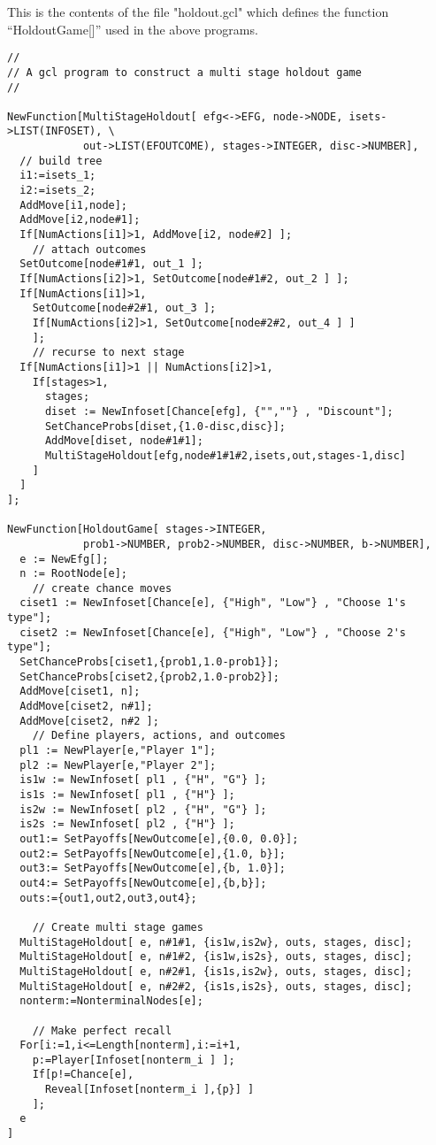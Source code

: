 \newpage
\noindent
This is the contents of the file "holdout.gcl" which defines the
function ``HoldoutGame[]'' used in the above programs.

{\scriptsize 
\begin{verbatim}
//
// A gcl program to construct a multi stage holdout game
//

NewFunction[MultiStageHoldout[ efg<->EFG, node->NODE, isets->LIST(INFOSET), \
            out->LIST(EFOUTCOME), stages->INTEGER, disc->NUMBER],
  // build tree
  i1:=isets_1;
  i2:=isets_2;
  AddMove[i1,node];
  AddMove[i2,node#1];
  If[NumActions[i1]>1, AddMove[i2, node#2] ];
    // attach outcomes
  SetOutcome[node#1#1, out_1 ]; 
  If[NumActions[i2]>1, SetOutcome[node#1#2, out_2 ] ];
  If[NumActions[i1]>1, 
    SetOutcome[node#2#1, out_3 ];
    If[NumActions[i2]>1, SetOutcome[node#2#2, out_4 ] ]
    ];
    // recurse to next stage
  If[NumActions[i1]>1 || NumActions[i2]>1,
    If[stages>1,
      stages;
      diset := NewInfoset[Chance[efg], {"",""} , "Discount"];
      SetChanceProbs[diset,{1.0-disc,disc}];
      AddMove[diset, node#1#1];
      MultiStageHoldout[efg,node#1#1#2,isets,out,stages-1,disc]
    ]
  ]
];

NewFunction[HoldoutGame[ stages->INTEGER,
            prob1->NUMBER, prob2->NUMBER, disc->NUMBER, b->NUMBER],
  e := NewEfg[];
  n := RootNode[e];
    // create chance moves
  ciset1 := NewInfoset[Chance[e], {"High", "Low"} , "Choose 1's type"];
  ciset2 := NewInfoset[Chance[e], {"High", "Low"} , "Choose 2's type"];
  SetChanceProbs[ciset1,{prob1,1.0-prob1}];
  SetChanceProbs[ciset2,{prob2,1.0-prob2}];
  AddMove[ciset1, n];
  AddMove[ciset2, n#1];
  AddMove[ciset2, n#2 ];
    // Define players, actions, and outcomes
  pl1 := NewPlayer[e,"Player 1"];
  pl2 := NewPlayer[e,"Player 2"];
  is1w := NewInfoset[ pl1 , {"H", "G"} ];
  is1s := NewInfoset[ pl1 , {"H"} ];
  is2w := NewInfoset[ pl2 , {"H", "G"} ];
  is2s := NewInfoset[ pl2 , {"H"} ];
  out1:= SetPayoffs[NewOutcome[e],{0.0, 0.0}];
  out2:= SetPayoffs[NewOutcome[e],{1.0, b}];
  out3:= SetPayoffs[NewOutcome[e],{b, 1.0}];
  out4:= SetPayoffs[NewOutcome[e],{b,b}];
  outs:={out1,out2,out3,out4};

    // Create multi stage games
  MultiStageHoldout[ e, n#1#1, {is1w,is2w}, outs, stages, disc];
  MultiStageHoldout[ e, n#1#2, {is1w,is2s}, outs, stages, disc];
  MultiStageHoldout[ e, n#2#1, {is1s,is2w}, outs, stages, disc];
  MultiStageHoldout[ e, n#2#2, {is1s,is2s}, outs, stages, disc];
  nonterm:=NonterminalNodes[e];

    // Make perfect recall 
  For[i:=1,i<=Length[nonterm],i:=i+1,
    p:=Player[Infoset[nonterm_i ] ];
    If[p!=Chance[e],
      Reveal[Infoset[nonterm_i ],{p}] ]
    ];	
  e
]
\end{verbatim}
}

